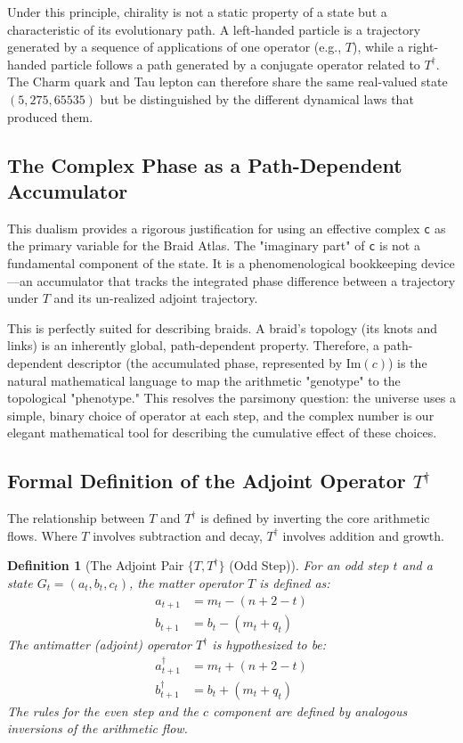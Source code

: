 \documentclass[11pt]{article}
\newtheorem{definition}[theorem]{Definition}
\theoremstyle{remark}
\begin{document}
Under this principle, chirality is not a static property of a state but a characteristic of its evolutionary path. A left-handed particle is a trajectory generated by a sequence of applications of one operator (e.g., $T$), while a right-handed particle follows a path generated by a conjugate operator related to $T^\dagger$. The Charm quark and Tau lepton can therefore share the same real-valued state $(5, 275, 65535)$ but be distinguished by the different dynamical laws that produced them.

\subsection{The Complex Phase as a Path-Dependent Accumulator}
This dualism provides a rigorous justification for using an effective complex \texttt{c} as the primary variable for the Braid Atlas. The "imaginary part" of \texttt{c} is not a fundamental component of the state. It is a phenomenological bookkeeping device---an accumulator that tracks the integrated phase difference between a trajectory under $T$ and its un-realized adjoint trajectory.

This is perfectly suited for describing braids. A braid's topology (its knots and links) is an inherently global, path-dependent property. Therefore, a path-dependent descriptor (the accumulated phase, represented by $\text{Im}(c)$) is the natural mathematical language to map the arithmetic "genotype" to the topological "phenotype." This resolves the parsimony question: the universe uses a simple, binary choice of operator at each step, and the complex number is our elegant mathematical tool for describing the cumulative effect of these choices.

\subsection{Formal Definition of the Adjoint Operator $T^\dagger$}
The relationship between $T$ and $T^\dagger$ is defined by inverting the core arithmetic flows. Where $T$ involves subtraction and decay, $T^\dagger$ involves addition and growth.

\begin{definition}[\texorpdfstring{The Adjoint Pair $\{T, T^\dagger\}$ (Odd Step)}{The Adjoint Pair T and T-dagger, Odd Step}]
For an odd step $t$ and a state $G_t=(a_t,b_t,c_t)$, the matter operator $T$ is defined as:
\begin{align*}
    a_{t+1} &= m_t - (n+2-t) \\
    b_{t+1} &= b_t - (m_t+q_t)
\end{align*}
The antimatter (adjoint) operator $T^\dagger$ is hypothesized to be:
\begin{align*}
    a_{t+1}^\dagger &= m_t + (n+2-t) \\
    b_{t+1}^\dagger &= b_t + (m_t+q_t)
\end{align*}
The rules for the even step and the $c$ component are defined by analogous inversions of the arithmetic flow.
\end{definition}
\end{document}
